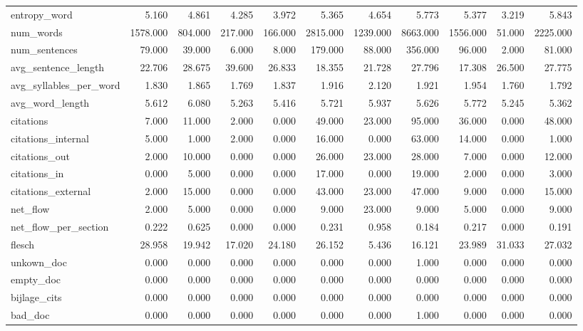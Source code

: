 \begin{tabular}{lrrrrrrrrrr}
\cline{1-11}
entropy\_word & 5.160 & 4.861 & 4.285 & 3.972 & 5.365 & 4.654 & 5.773 & 5.377 & 3.219 & 5.843 \\
\cline{1-11}
num\_words & 1578.000 & 804.000 & 217.000 & 166.000 & 2815.000 & 1239.000 & 8663.000 & 1556.000 & 51.000 & 2225.000 \\
\cline{1-11}
num\_sentences & 79.000 & 39.000 & 6.000 & 8.000 & 179.000 & 88.000 & 356.000 & 96.000 & 2.000 & 81.000 \\
\cline{1-11}
avg\_sentence\_length & 22.706 & 28.675 & 39.600 & 26.833 & 18.355 & 21.728 & 27.796 & 17.308 & 26.500 & 27.775 \\
\cline{1-11}
avg\_syllables\_per\_word & 1.830 & 1.865 & 1.769 & 1.837 & 1.916 & 2.120 & 1.921 & 1.954 & 1.760 & 1.792 \\
\cline{1-11}
avg\_word\_length & 5.612 & 6.080 & 5.263 & 5.416 & 5.721 & 5.937 & 5.626 & 5.772 & 5.245 & 5.362 \\
\cline{1-11}
citations & 7.000 & 11.000 & 2.000 & 0.000 & 49.000 & 23.000 & 95.000 & 36.000 & 0.000 & 48.000 \\
\cline{1-11}
citations\_internal & 5.000 & 1.000 & 2.000 & 0.000 & 16.000 & 0.000 & 63.000 & 14.000 & 0.000 & 1.000 \\
\cline{1-11}
citations\_out & 2.000 & 10.000 & 0.000 & 0.000 & 26.000 & 23.000 & 28.000 & 7.000 & 0.000 & 12.000 \\
\cline{1-11}
citations\_in & 0.000 & 5.000 & 0.000 & 0.000 & 17.000 & 0.000 & 19.000 & 2.000 & 0.000 & 3.000 \\
\cline{1-11}
citations\_external & 2.000 & 15.000 & 0.000 & 0.000 & 43.000 & 23.000 & 47.000 & 9.000 & 0.000 & 15.000 \\
\cline{1-11}
net\_flow & 2.000 & 5.000 & 0.000 & 0.000 & 9.000 & 23.000 & 9.000 & 5.000 & 0.000 & 9.000 \\
\cline{1-11}
net\_flow\_per\_section & 0.222 & 0.625 & 0.000 & 0.000 & 0.231 & 0.958 & 0.184 & 0.217 & 0.000 & 0.191 \\
\cline{1-11}
flesch & 28.958 & 19.942 & 17.020 & 24.180 & 26.152 & 5.436 & 16.121 & 23.989 & 31.033 & 27.032 \\
\cline{1-11}
unkown\_doc & 0.000 & 0.000 & 0.000 & 0.000 & 0.000 & 0.000 & 1.000 & 0.000 & 0.000 & 0.000 \\
\cline{1-11}
empty\_doc & 0.000 & 0.000 & 0.000 & 0.000 & 0.000 & 0.000 & 0.000 & 0.000 & 0.000 & 0.000 \\
\cline{1-11}
bijlage\_cits & 0.000 & 0.000 & 0.000 & 0.000 & 0.000 & 0.000 & 0.000 & 0.000 & 0.000 & 0.000 \\
\cline{1-11}
bad\_doc & 0.000 & 0.000 & 0.000 & 0.000 & 0.000 & 0.000 & 1.000 & 0.000 & 0.000 & 0.000 \\
\cline{1-11}
\bottomrule
\end{tabular}
